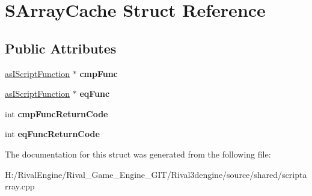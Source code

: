 \hypertarget{struct_s_array_cache}{}\section{S\+Array\+Cache Struct Reference}
\label{struct_s_array_cache}
\subsection*{Public Attributes}
\begin{DoxyCompactItemize}
\item 
\mbox{\label{struct_s_array_cache_a2bac5bd2e8aabcd00794b9439e5a1066}} 
\hyperlink{classas_i_script_function}{as\+I\+Script\+Function} $\ast$ {\bfseries cmp\+Func}
\item 
\mbox{\label{struct_s_array_cache_a6bfdfcc7ac5db6711be9d00d6ef42789}} 
\hyperlink{classas_i_script_function}{as\+I\+Script\+Function} $\ast$ {\bfseries eq\+Func}
\item 
\mbox{\label{struct_s_array_cache_a62f50aaa6435b8241853f380b313bc8f}} 
int {\bfseries cmp\+Func\+Return\+Code}
\item 
\mbox{\label{struct_s_array_cache_ac56e83dadf22ea2e139858d3a27add98}} 
int {\bfseries eq\+Func\+Return\+Code}
\end{DoxyCompactItemize}


The documentation for this struct was generated from the following file\+:\begin{DoxyCompactItemize}
\item 
H\+:/\+Rival\+Engine/\+Rival\+\_\+\+Game\+\_\+\+Engine\+\_\+\+G\+I\+T/\+Rival3dengine/source/shared/scriptarray.\+cpp\end{DoxyCompactItemize}
